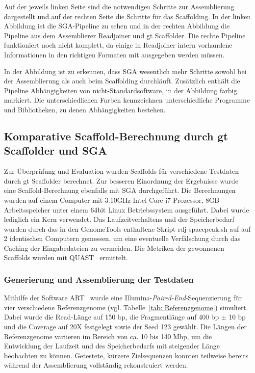 \documentclass[a4paper,10pt,parskip]{scrartcl}
\begin{document}
Auf der jeweils linken Seite sind die notwendigen Schritte zur
Assemblierung dargestellt und auf der rechten Seite die Schritte für
das Scaffolding. In der linken Abbildung ist die SGA-Pipeline zu sehen
und in der rechten Abbildung die Pipeline aus dem Assemblierer
Readjoiner und gt Scaffolder. Die rechte Pipeline funktioniert noch
nicht komplett, da einige in Readjoiner intern vorhandene
Informationen in den richtigen Formaten mit ausgegeben werden müssen.

In der Abbildung ist zu erkennen, dass SGA wesentlich mehr Schritte
sowohl bei der Assemblierung als auch beim Scaffolding
durchläuft. Zusätzlich enthält die Pipeline Abhängigkeiten von
nicht-Standardsoftware, in der Abbildung farbig markiert. Die
unterschiedlichen Farben kennzeichnen unterschiedliche Programme und
Bibliotheken, zu denen Abhängigkeiten bestehen.

\subsection{Komparative Scaffold-Berechnung durch gt Scaffolder und SGA}
Zur Überprüfung und Evaluation wurden Scaffolds für verschiedene Testdaten durch
gt Scaffolder berechnet. Zur besseren Einordnung der Ergebnisse wurde eine
Scaffold-Berechnung ebenfalls mit SGA durchgeführt. Die Berechnungen wurden auf
einem Computer mit 3.10GHz Intel Core-i7 Prozessor, 8GB Arbeitsspeicher unter
einem 64bit Linux Betriebssystem ausgeführt. Dabei wurde lediglich ein Kern
verwendet. Das Laufzeitverhaltens und der Speicherbedarf wurden durch das in den
GenomeTools enthaltene Skript rdj-spacepeak.sh auf auf 2 identischen Computern
gemessen, um eine eventuelle Verfälschung durch das
Caching der Eingabedateien zu vermeiden. Die Metriken der gewonnenen Scaffolds
wurden mit QUAST~\cite{Gurevich:2013je} ermittelt.


\subsubsection*{Generierung und Assemblierung der Testdaten}
Mithilfe der Software ART~\cite{Huang:2012kq} wurde eine
Illumina-\textit{Paired-End}-Sequenzierung für vier verschiedene Referenzgenome
(vgl. Tabelle~\ref{tab: Referenzgenome}) simuliert. Dabei wurde die Read-Länge
auf 150 bp, die Fragmentlänge auf 400 bp $\pm$ 10 bp und die Coverage auf
20X festgelegt sowie der Seed 123 gewählt. Die Längen der Referenzgenome
variieren im Bereich von ca. 10 bis 140 Mbp, um die Entwicklung der Laufzeit
und des Speicherbedarfs mit steigender Länge beobachten zu können.
Getestete, kürzere Zielsequenzen konnten teilweise bereits während der
Assemblierung vollständig rekonstruiert werden.
\end{document}
